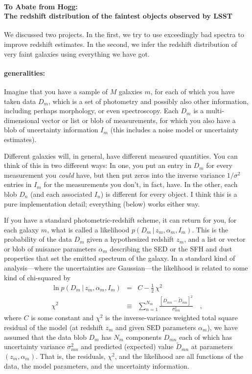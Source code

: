 \documentclass[12pt]{article}
\newcommand{\given}{\,|\,}
\begin{document}
\paragraph{To Abate from Hogg:\\
The redshift distribution of the faintest objects observed by LSST}
We discussed two projects.  In the first, we try to use exceedingly
bad spectra to improve redshift estimates.  In the second, we infer
the redshift distribution of very faint galaxies using everything we
have got.

\paragraph{generalities:}
Imagine that you have a sample of $M$ galaxies $m$, for each of which
you have taken data $D_m$, which is a set of photometry and possibly
also other information, including perhaps morphology, or even
spectroscopy.  Each $D_m$ is a multi-dimensional vector or list or
blob of measurements, for which you also have a blob of uncertainty
information $I_m$ (this includes a noise model or uncertainty
estimates).

Different galaxies will, in general, have different measured
quantities.  You can think of this in two different ways: In one, you
put an entry in $D_m$ for every measurement you \emph{could} have, but
then put zeros into the inverse variance $1/\sigma^2$ entries in $I_m$
for the measurements you don't, in fact, have.  In the other, each
blob $D_n$ (and each associated $I_n$) is different for every object.
I think this is a pure implementation detail; everything (below) works
either way.

If you have a standard photometric-redshift scheme, it can return for
you, for each galaxy $m$, what is called a likelihood $p(D_m \given
z_m,\alpha_m,I_m)$.  This is the probability of the data $D_m$ given a
hypothesized redshift $z_m$, and a list or vector or blob of nuisance
parameters $\alpha_m$ describing the SED or the SFH and dust
properties that set the emitted spectrum of the galaxy.  In a standard
kind of analysis---where the uncertainties are Gaussian---the
likelihood is related to some kind of chi-squared by
\begin{eqnarray}\displaystyle
\ln p(D_m \given z_m, \alpha_m, I_m) &=& C-\frac{1}{2}\,\chi^2
\\
\chi^2 &\equiv& \sum_{n=1}^{N_m} \frac{[D_{mn}-\tilde{D}_{mn}]^2}{\sigma_{mn}^2}
\quad,
\end{eqnarray}
where $C$ is some constant and $\chi^2$ is the inverse-variance
weighted total square residual of the model (at redshift $z_m$ and
given SED parameters $\alpha_m$), we have assumed that the data blob
$D_m$ has $N_m$ components $D_{mn}$ each of which has uncertainty
variance $\sigma_{mn}^2$ and predicted (expected) value
$\tilde{D}_{mn}$ at parameters $(z_m, \alpha_m)$.  That is, the
residuals, $\chi^2$, and the likelihood are all functions of the data,
the model parameters, and the uncertainty information.
\end{document}
